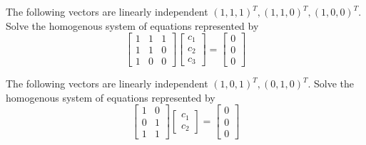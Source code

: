 	
 




\begin{example}
	The following vectors are linearly independent $(1, 1, 1)^T, (1, 1, 0)^T, (1, 0, 0)^T$.  Solve the homogenous system of equations represented by 
	\[  \begin{bmatrix}  1	& 1	& 1\\ 1 & 1  &  0\\ 1  &  0  &  0   \end{bmatrix} \begin{bmatrix} c_1 \\ c_2 \\ c_3     \end{bmatrix}  = \begin{bmatrix}  0 \\ 0  \\ 0 \end{bmatrix} \]
	
\end{example}






\begin{example}
	The following vectors are linearly independent $(1,0, 1)^T, (0, 1, 0)^T$.  Solve the homogenous system of equations represented by 
	\[  \begin{bmatrix}  1	& 0	\\ 0 & 1  \\ 1  &  1     \end{bmatrix} \begin{bmatrix} c_1 \\ c_2    \end{bmatrix}  = \begin{bmatrix}  0 \\ 0 \\0   \end{bmatrix} \]
	
\end{example}







